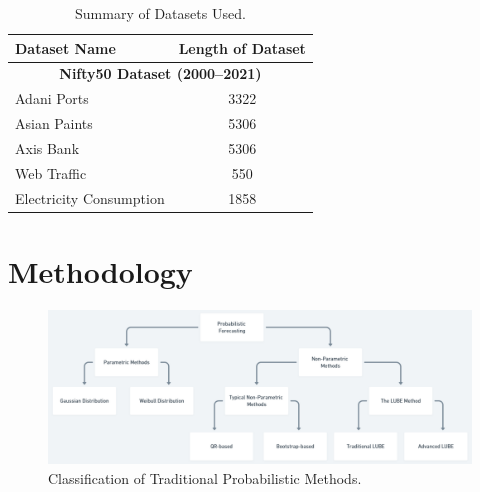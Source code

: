 \begin{table}[!ht]
    \caption{Summary of Datasets Used.}
    \centering
    \begin{tabular}{|p{5cm}|c|}
        \hline
        \textbf{Dataset Name} & \textbf{Length of Dataset} \\
        \hline
        \multicolumn{2}{|c|}{\textbf{Nifty50 Dataset (2000--2021)}} \\
        \hline
        Adani Ports & 3322 \\
        Asian Paints & 5306 \\
        Axis Bank & 5306 \\
        \hline
        Web Traffic & 550 \\
        Electricity Consumption & 1858 \\
        \hline
    \end{tabular}
    \label{tab:dataset_summary}
\end{table}


\section{ Methodology}
\begin{figure}[!t]
    \centering
    \includegraphics[width=15cm]{Chap02/Classification Of Probabilistic Methods.jpg}
    \caption{Classification of Traditional Probabilistic Methods.}
    \label{fig1}
\end{figure}

